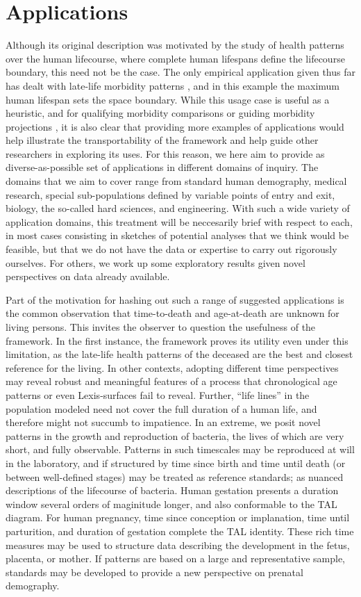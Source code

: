 \documentclass[11pt,oneside]{article} %
\begin{document}
\section{Applications}

Although its original description was
motivated by the study of health patterns over the human lifecourse, where
complete human lifespans define the lifecourse boundary, this need not be the
case. The only empirical application given thus far has dealt with late-life
morbidity patterns \citep{riffe2015ttd}, and in this example the maximum human
lifespan sets the space boundary. While
this usage case is useful as a heuristic, and for qualifying morbidity comparisons or guiding morbidity projections
\citep{vanRaalte2015HLE}, it is also clear that providing more
examples of applications would help illustrate the transportability of the
framework and help guide other researchers in exploring its uses. For this
reason, we here aim to provide as diverse-as-possible set of applications in
different domains of inquiry. The domains that we aim to cover range from
standard human demography, medical research, special sub-populations defined by
variable points of entry and exit, biology, the so-called hard sciences, and
engineering. With such a wide variety of application domains, this treatment
will be neccesarily brief with respect to each, in most cases consisting in
sketches of potential analyses that we think would be feasible, but that we do
not have the data or expertise to carry out rigorously ourselves. For others, we
work up some exploratory results given novel perspectives on data already
available. 

Part of the motivation for hashing out such a range of suggested applications is
the common observation that time-to-death and age-at-death are unknown for
living persons. This invites the observer to question the
usefulness of the framework. In the first instance, the framework proves its
utility even under this limitation, as the late-life health patterns of the
deceased are the best and closest reference for the living. In other contexts,
adopting different time perspectives may reveal robust and meaningful features
of a process that chronological age patterns or even Lexis-surfaces fail to
reveal. Further, ``life lines'' in the population modeled need not cover the
full duration of a human life, and therefore might not succumb to impatience.
In an extreme, we posit novel patterns in the growth and reproduction of
bacteria, the lives of which are very short, and fully observable. Patterns in
such timescales may be reproduced at will in the laboratory, and if structured
by time since birth and time until death (or between well-defined stages) may be
treated as reference standards; as nuanced descriptions of the lifecourse of bacteria. Human gestation presents a duration window several orders of
maginitude longer, and also conformable to the TAL diagram. For human pregnancy,
time since conception or implanation, time until parturition, and duration
of gestation complete the TAL identity. These rich time measures may be used to
structure data describing the development in the fetus, placenta, or mother. If
patterns are based on a large and representative sample, standards
may be developed to provide a new perspective on prenatal demography.
\end{document}
